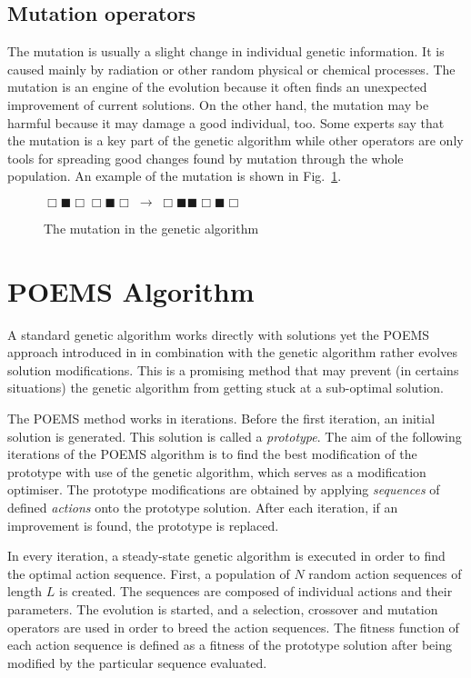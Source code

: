 \subsection{Mutation operators}

The mutation is usually a slight change in individual genetic information. It is caused mainly by radiation or other random physical or chemical processes. The mutation is an engine of the evolution because it often finds an unexpected improvement of current solutions. On the other hand, the mutation may be harmful because it may damage a good individual, too. Some experts say that the mutation is a key part of the genetic algorithm while other operators are only tools for spreading good changes found by mutation through the whole population. An example of the mutation is shown in Fig.~\ref{fig:mutation}.

\begin{figure}
\begin{center}
$ \Box \blacksquare \Box \Box \blacksquare \Box \; \rightarrow \; \Box \blacksquare \blacksquare \Box \blacksquare \Box $
\end{center}
\caption{The mutation in the genetic algorithm}
\label{fig:mutation}
\end{figure}

\section{POEMS Algorithm}

A standard genetic algorithm works directly with solutions yet the POEMS approach introduced in \cite{poems} in combination with the genetic algorithm rather evolves solution modifications. This is a promising method that may prevent (in certains situations) the genetic algorithm from getting stuck at a sub-optimal solution.

The POEMS method works in iterations. Before the first iteration, an initial solution is generated. This solution is called a {\em prototype}. The aim of the following iterations of the POEMS algorithm is to find the best modification of the prototype with use of the genetic algorithm, which serves as a modification optimiser. The prototype modifications are obtained by applying {\em sequences} of defined {\em actions} onto the prototype solution. After each iteration, if an improvement is found, the prototype is replaced. 

In every iteration, a steady-state genetic algorithm is executed in order to find the optimal action sequence. First, a population of $N$ random action sequences of length $L$ is created. The sequences are composed of individual actions and their parameters. The evolution is started, and a selection, crossover and mutation operators are used in order to breed the action sequences. The fitness function of each action sequence is defined as a fitness of the prototype solution after being modified by the particular sequence evaluated.

